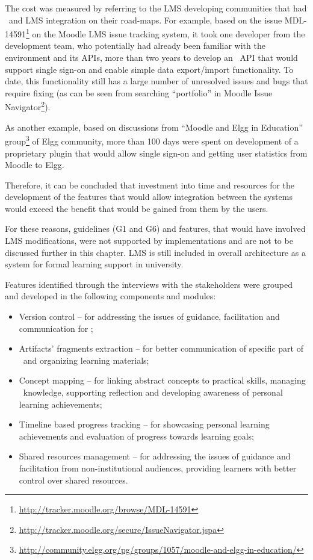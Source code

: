 The cost was measured by referring to the LMS developing communities that had
\ep~and LMS integration on their road-maps. For example, based on the issue
MDL-14591\footnote{\url{http://tracker.moodle.org/browse/MDL-14591}} on the
Moodle LMS issue tracking system, it took one developer from the development
team, who potentially had already been familiar with the environment and its
APIs, more than two years to develop an \ep~API that would support single
sign-on and enable simple data export/import functionality. To date, this
functionality still has a large number of unresolved issues and bugs that
require fixing (as can be seen from searching ``portfolio'' in Moodle Issue
Navigator\footnote{\url{http://tracker.moodle.org/secure/IssueNavigator.jspa}}).

As another example, based on discussions from ``Moodle and Elgg in Education''
group\footnote{\url{http://community.elgg.org/pg/groups/1057/moodle-and-elgg-in-education/}}
of Elgg community, more than 100 days were spent on development of a proprietary
plugin that would allow single sign-on and getting user statistics from Moodle
to Elgg.

Therefore, it can be concluded that investment into time and resources for the
development of the features that would allow integration between the systems
would exceed the benefit that would be gained from them by the users.

For these reasons, guidelines (G1 and G6) and features, that would have involved
LMS modifications, were not supported by implementations and are not to be
discussed further in this chapter. LMS is still included in overall architecture
as a system for formal learning support in university.
 
Features identified through the interviews with the stakeholders were grouped
and developed in the following components and modules: 

\begin{itemize}
  \item Version control -- for addressing the issues of guidance, facilitation
  and communication for \LLLsn;
  \item Artifacts' fragments extraction -- for better communication of specific
  part of \ep~and organizing learning materials;
  \item Concept mapping -- for linking abstract concepts to practical skills,
  managing \ep~knowledge, supporting reflection and developing awareness of
  personal learning achievements;
  \item Timeline based progress tracking -- for showcasing personal learning
  achievements and evaluation of progress towards learning goals;
  \item Shared resources management -- for addressing the issues of guidance
  and facilitation from non-institutional audiences, providing learners with
  better control over shared resources.
\end{itemize}

